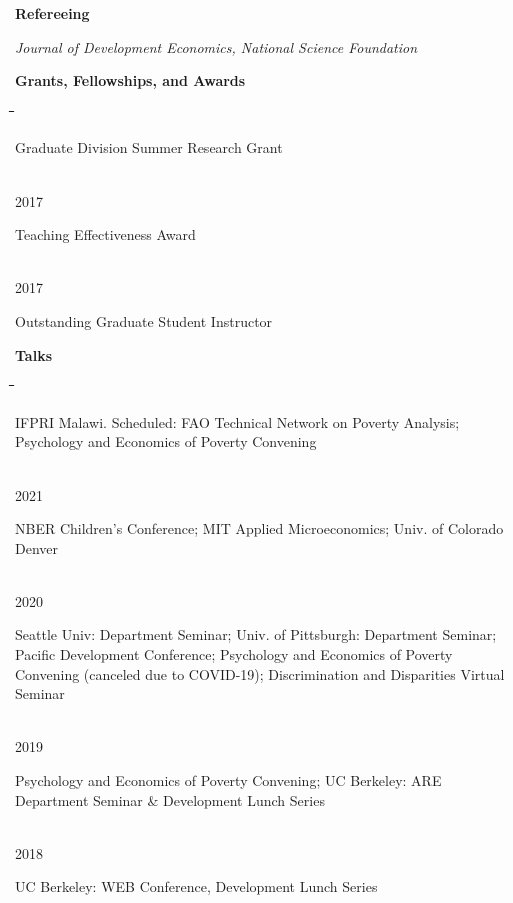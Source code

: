 \documentclass[10pt, oneside]{article}
\makeatletter
\newlength\tdima
\newcommand\tabfill[1]{%
      \setlength\tdima{\linewidth}%
      \addtolength\tdima{\@totalleftmargin}%
      \addtolength\tdima{-\dimen\@curtab}%
      \parbox[t]{\tdima}{#1\ifhmode\strut\fi}}
\newcommand\mytabs{\hspace*{1cm}\=\hspace{1cm}\=\hspace{1cm}\=\hspace{1cm}\=\hspace{1cm}\=\hspace{1cm}\=\hspace{1cm}\=\hspace{1cm}\=\hspace{1cm}\=\hspace{1cm}}
\newenvironment{mysec}[1][\mytabs]
  {\begin{tabbing}#1\kill\ignorespaces}
  {\end{tabbing}}
\makeatother
\begin{document}
\begin{minipage}[t]{0.1\linewidth}
\textbf{Refereeing}
\end{minipage}\hspace{0.05\linewidth}
\begin{minipage}[t]{0.8\linewidth}
 \emph{Journal of Development Economics, National Science Foundation}
\end{minipage}\vspace{5mm}



\begin{minipage}[t]{0.1\linewidth}
\textbf{Grants, Fellowships, and Awards}
\end{minipage}\hspace{0.05\linewidth}
\begin{minipage}[t]{0.8\linewidth}
\begin{mysec} 
	2018 \>\>\tabfill{Graduate Division Summer Research Grant} \\
	2017 \>\>\tabfill{Teaching Effectiveness Award}\\
	2017 \>\>\tabfill{Outstanding Graduate Student Instructor}
\end{mysec} 
\end{minipage}\vspace{5mm}


\begin{minipage}[t]{0.1\linewidth}
\textbf{Talks}
\end{minipage}\hspace{0.05\linewidth}
\begin{minipage}[t]{0.8\linewidth}
\begin{mysec} 
	2022\>\> \tabfill{ IFPRI Malawi. Scheduled: FAO Technical Network on Poverty Analysis; Psychology and Economics of Poverty Convening} \\
	2021\>\> \tabfill{ NBER Children's Conference; MIT Applied Microeconomics; Univ. of Colorado Denver} \\
	2020\>\> \tabfill{Seattle Univ: Department Seminar; Univ. of Pittsburgh: Department Seminar; Pacific  Development Conference; Psychology and Economics of Poverty Convening (canceled due to COVID-19); Discrimination and Disparities Virtual Seminar } \\
	2019\>\> \tabfill{Psychology and Economics of Poverty Convening; UC Berkeley: ARE Department Seminar \& Development Lunch Series} \\
	2018\>\> \tabfill{UC Berkeley: WEB Conference,  Development Lunch Series} \\
\end{mysec} 
\end{minipage}\vspace{4mm}
\end{document}
